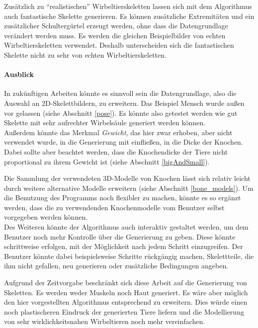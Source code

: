 Zusätzlich zu "`realistischen"' Wirbeltierskeletten lassen sich mit dem Algorithmus auch fantastische Skelette generieren. Es können zusätzliche Extremitäten und ein zusätzlicher Schultergürtel erzeugt werden, ohne dass die Datengrundlage verändert werden muss. Es werden die gleichen Beispielbilder von echten Wirbeltierskeletten verwendet.
Deshalb unterscheiden sich die fantastischen Skelette nicht zu sehr von echten Wirbeltierskeletten.  


\newpage
\paragraph{Ausblick}
In zukünftigen Arbeiten könnte es sinnvoll sein die Datengrundlage, also die Auswahl an 2D-Skelettbildern, zu erweitern. Das Beispiel Mensch wurde \zb außen vor gelassen (siehe Abschnitt \ref{pose}). Es könnte also getestet werden wie gut Skelette mit sehr aufrechter Wirbelsäule generiert werden können.\\
Außerdem könnte das Merkmal \emph{Gewicht}, das hier zwar erhoben, aber nicht verwendet wurde, in die Generierung mit einfließen, \zb in die Dicke der Knochen. Dabei sollte aber beachtet werden, dass die Knochendicke der Tiere nicht proportional zu ihrem Gewicht ist (siehe Abschnitt \ref{bigAndSmall}).

Die Sammlung der verwendeten 3D-Modelle von Knochen lässt sich relativ leicht durch weitere \bzw alternative Modelle erweitern (siehe Abschnitt \ref{bone_models}). Um die Benutzung des Programms noch flexibler zu machen, könnte es so ergänzt werden, dass die zu verwendenden Knochenmodelle vom Benutzer selbst vorgegeben werden können.\\
Des Weiteren könnte der Algorithmus auch interaktiv gestaltet werden, um dem Benutzer noch mehr Kontrolle über die Generierung zu geben. Diese könnte \zb schrittweise erfolgen, mit der Möglichkeit nach jedem Schritt einzugreifen. Der Benutzer könnte dabei beispielsweise Schritte rückgängig machen, Skelettteile, die ihm nicht gefallen, neu generieren oder zusätzliche Bedingungen angeben.

Aufgrund der Zeitvorgabe beschränkt sich diese Arbeit auf die Generierung von Skeletten. Es werden weder Muskeln noch Haut generiert. Es wäre aber möglich den hier vorgestellten Algorithmus entsprechend zu erweitern. Dies würde einen noch plastischeren Eindruck der generierten Tiere liefern und die Modellierung von sehr wirklichkeitsnahen Wirbeltieren noch mehr vereinfachen.


